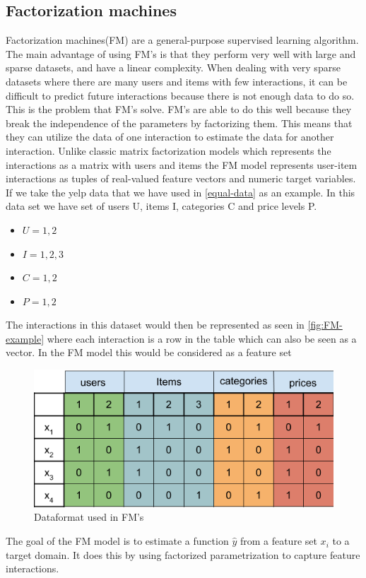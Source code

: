 \subsection{Factorization machines}
Factorization machines(FM) are a general-purpose supervised learning algorithm.
The main advantage of using FM's is that they perform very well with large and sparse datasets, and have a linear complexity.
When dealing with very sparse datasets where there are many users and items with few interactions, it can be difficult to predict future interactions because there is not enough data to do so.
This is the problem that FM's solve.
FM's are able to do this well because they break the independence of the parameters by factorizing them.
This means that they can utilize the data of one interaction to estimate the data for another interaction.
Unlike classic matrix factorization models which represents the interactions as a matrix with users and items the FM model represents user-item interactions as tuples of real-valued feature vectors and numeric target variables.
If we take the yelp data that we have used in \autoref{equal-data} as an example.
In this data set we have set of users U, items I, categories C and price levels P.
\begin{itemize}
	\item $U = {1, 2}$
	\item $I = {1, 2 ,3}$
	\item $C = {1, 2}$
	\item $P = {1, 2}$
\end{itemize}
The interactions in this dataset would then be represented as seen in \autoref{fig:FM-example} where each interaction is a row in the table which can also be seen as a vector.
In the FM model this would be considered as a feature set
\begin{figure}
    \centering
    \includegraphics[scale=0.5]{figures/FM-example.png}
    \caption{Dataformat used in FM's}
    \label{fig:FM-example}
\end{figure}
The goal of the FM model is to estimate a function $\hat{y}$ from a feature set $x_i$ to a target domain. 
It does this by using factorized parametrization to capture feature interactions.

